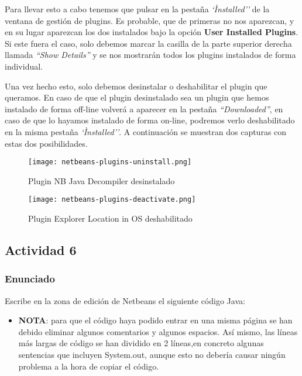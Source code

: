 Para llevar esto a cabo tenemos que pulsar en la pestaña \textit{`Ìnstalled''} de la ventana de gestión de plugins. Es probable, que de primeras no nos aparezcan, y en su lugar aparezcan los dos instalados bajo la opción \textbf{User Installed Plugins}. Si este fuera el caso, solo debemos marcar la casilla de la parte superior derecha llamada \textit{``Show Details''} y se nos mostrarán todos los plugins instalados de forma individual.

Una vez hecho esto, solo debemos desinstalar o deshabilitar el plugin que queramos. En caso de que el plugin desinstalado sea un plugin que hemos instalado de forma off-line volverá a aparecer en la pestaña \textit{``Downloaded''}, en caso de que lo hayamos instalado de forma on-line, podremos verlo deshabilitado en la misma pestaña \textit{`Ìnstalled''}. A continuación se muestran dos capturas con estas dos posibilidades.

\begin{figure}[H]
    \centering
    \texttt{[image: netbeans-plugins-uninstall.png]}
    \caption{Plugin NB Java Decompiler desinstalado}
\end{figure}

\begin{figure}[H]
    \centering
    \texttt{[image: netbeans-plugins-deactivate.png]}
    \caption{Plugin Explorer Location in OS deshabilitado}
\end{figure}

\subsection{Actividad 6}
\subsubsection{Enunciado}
Escribe en la zona de edición de Netbeans el siguiente código Java:

\begin{itemize}
    \item \textbf{NOTA}: para que el código haya podido entrar en una misma página se han debido eliminar algunos comentarios y algunos espacios. Así mismo, las líneas más largas de código se han dividido en 2 líneas,en concreto algunas sentencias que incluyen System.out, aunque esto no debería causar ningún problema a la hora de copiar el código.
\end{itemize}

